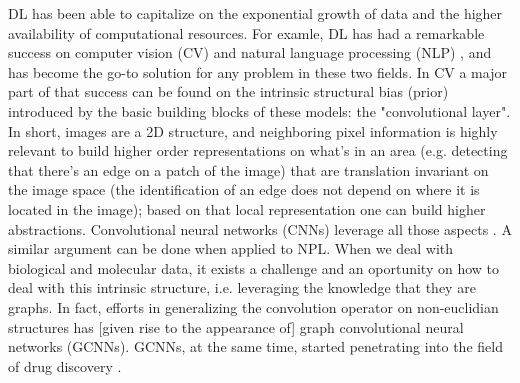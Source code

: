 \documentclass{article}
\begin{document}
 
DL has been able to capitalize on the exponential growth of data and the higher
 availability of computational resources. For examle, DL has had a remarkable success on
 computer vision (CV) \cite{Guo2016} and natural language processing (NLP)
 \cite{Young2018}, and has become the go-to solution for any problem in these two
 fields. In CV a major part of that success can be found on the 
{\color{red} intrinsic structural bias (prior) introduced by the basic building blocks
 of these models: the "convolutional layer". In short, images are a 2D structure, and
 neighboring pixel information is highly relevant to build higher order representations
 on what's in an area (e.g. detecting that there's an edge on a patch of the image) that
 are translation invariant on the image space (the identification of an edge does not
 depend on where it is located in the image); based on that local representation one can
 build higher abstractions. Convolutional neural networks (CNNs) leverage all those
 aspects \cite{Fukushima1980, LeCun1989, Ulyanov}.} A similar argument can be done when
 applied to NPL. When we deal with biological and molecular data, it exists a challenge
 and an oportunity on how to deal with this intrinsic structure, i.e. leveraging the
 knowledge that they are graphs. In fact, efforts in generalizing the convolution
 operator on non-euclidian structures has {\color{red}[given rise to the appearance of]}
 graph convolutional neural networks (GCNNs)\cite{Wu2019}. GCNNs, at the same time,
 started penetrating into the field of drug discovery \cite{Sun2019}.


\end{document}
